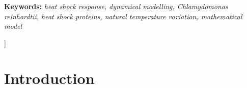 \documentclass[oneside, 10pt, a4paper, twocolumn]{article}
\providecommand{\keywords}[1]{\textbf{Keywords:} \textit{#1}}
\begin{document}
\begin{@twocolumnfalse}
\begin{abstract}
    \end{abstract}
    \vspace{0.2cm}
    \keywords{heat shock response, dynamical modelling, Chlamydomonas reinhardtii, heat shock proteins, natural temperature variation, mathematical model}
    \vspace{1cm}
  \end{@twocolumnfalse}
]



\section{Introduction}
\end{document}
